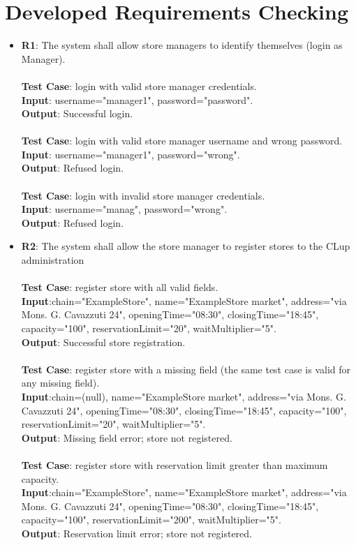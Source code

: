 \section{Developed Requirements Checking}



\begin{itemize}
	\item \textbf{R1}: The system shall allow store managers to identify themselves (login as Manager). \\ \\ \textbf{Test Case}: login with valid store manager credentials.  \\  \textbf{Input}: username="manager1", password="password".\\ 		\textbf{Output}: Successful login. \\
\\ \textbf{Test Case}: login with valid store manager username and wrong password.  \\  \textbf{Input}: username="manager1", password="wrong".\\ 		\textbf{Output}: Refused login. \\
\\ \textbf{Test Case}: login with invalid store manager credentials.  \\  \textbf{Input}: username="manag", password="wrong".\\ 		\textbf{Output}: Refused login.



	\item \textbf{R2}: The system shall allow the store manager to register stores to the CLup administration  \\ \\ \textbf{Test Case}: register store with all valid fields.  \\  \textbf{Input}:chain="ExampleStore", name="ExampleStore market", address="via Mons. G. Cavazzuti 24", openingTime="08:30", closingTime="18:45", capacity="100", reservationLimit="20", waitMultiplier="5".\\ 		\textbf{Output}: Successful store registration. \\
\\ \textbf{Test Case}: register store with a missing field (the same test case is valid for any missing field).  \\  \textbf{Input}:chain=(null), name="ExampleStore market", address="via Mons. G. Cavazzuti 24", openingTime="08:30", closingTime="18:45", capacity="100", reservationLimit="20", waitMultiplier="5".\\ 		\textbf{Output}: Missing field error; store not registered. \\
\\ \textbf{Test Case}: register store with reservation limit greater than maximum capacity.  \\  \textbf{Input}:chain="ExampleStore", name="ExampleStore market", address="via Mons. G. Cavazzuti 24", openingTime="08:30", closingTime="18:45", capacity="100", reservationLimit="200", waitMultiplier="5".\\ 		\textbf{Output}: Reservation limit error; store not registered.




\end{itemize}
